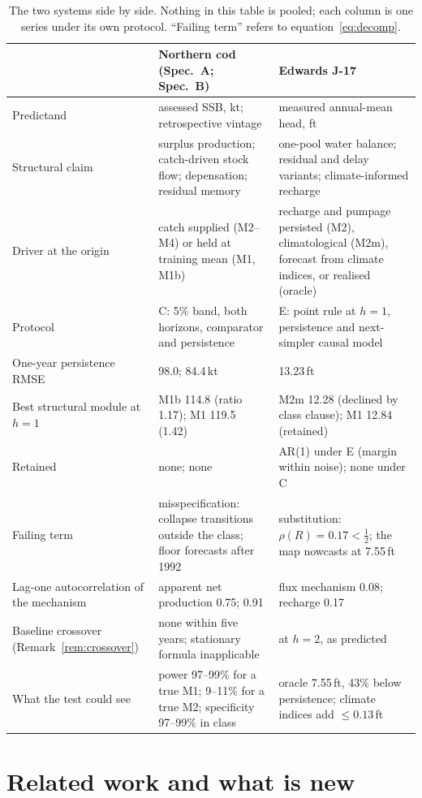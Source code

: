 \documentclass[preprint,11pt,authoryear]{elsarticle}
\theoremstyle{definition}
\theoremstyle{remark}
\begin{document}
\begin{table}[!htb]
\centering\small
\caption{The two systems side by side. Nothing in this table is pooled; each column is one series under its own protocol. ``Failing term'' refers to equation~\eqref{eq:decomp}.}
\label{tab:cross}
\begin{tabularx}{\textwidth}{@{}>{\raggedright\arraybackslash}p{}LL@{}}
\toprule
 & Northern cod (Spec.\ A; Spec.\ B) & Edwards J-17 \\
\midrule
Predictand & assessed SSB, kt; retrospective vintage & measured annual-mean head, ft \\
Structural claim & surplus production; catch-driven stock flow; depensation; residual memory & one-pool water balance; residual and delay variants; climate-informed recharge \\
Driver at the origin & catch supplied (M2--M4) or held at training mean (M1, M1b) & recharge and pumpage persisted (M2), climatological (M2m), forecast from climate indices, or realised (oracle) \\
Protocol & C: 5\% band, both horizons, comparator and persistence & E: point rule at $h=1$, persistence and next-simpler causal model \\
One-year persistence RMSE & 98.0; 84.4\,kt & 13.23\,ft \\
Best structural module at $h=1$ & M1b 114.8 (ratio 1.17); M1 119.5 (1.42) & M2m 12.28 (declined by class clause); M1 12.84 (retained) \\
Retained & none; none & AR(1) under E (margin within noise); none under C \\
Failing term & misspecification: collapse transitions outside the class; floor forecasts after 1992 & substitution: $\rho(R)=0.17<\tfrac12$; the map nowcasts at 7.55\,ft \\
Lag-one autocorrelation of the mechanism & apparent net production 0.75; 0.91 & flux mechanism 0.08; recharge 0.17 \\
Baseline crossover (Remark~\ref{rem:crossover}) & none within five years; stationary formula inapplicable & at $h=2$, as predicted \\
What the test could see & power 97--99\% for a true M1; 9--11\% for a true M2; specificity 97--99\% in class & oracle 7.55\,ft, 43\% below persistence; climate indices add $\le0.13$\,ft \\
\bottomrule
\end{tabularx}
\end{table}
\FloatBarrier
\section{Related work and what is new}\label{sec:related}
\end{document}
